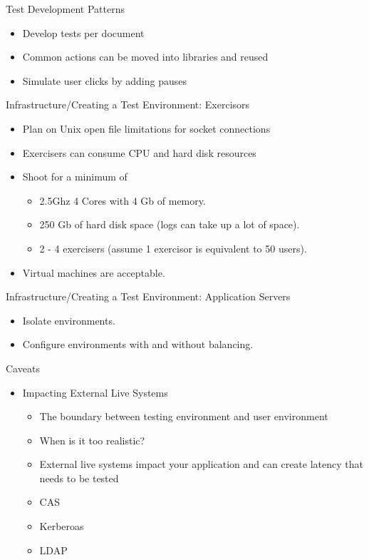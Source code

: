 \documentclass[xcolor=dvipsnames,14pt]{beamer}
\begin{document}
\begin{frame}{Test Development Patterns}
  \begin{itemize}
    \item Develop tests per document
    \item Common actions can be moved into libraries and reused
    \item Simulate user clicks by adding pauses
  \end{itemize}
\end{frame}

\begin{frame}{Infrastructure/Creating a Test Environment: Exercisors}
  \begin{itemize}
    \item Plan on Unix open file limitations for socket connections
    \item Exercisers can consume CPU and hard disk resources
    \item Shoot for a minimum of
    \begin{itemize}
      \item 2.5Ghz 4 Cores with 4 Gb of memory.
      \item 250 Gb of hard disk space (logs can take up a lot of space).
      \item 2 - 4 exercisers (assume 1 exercisor is equivalent to 50 users).
    \end{itemize}
    \item Virtual machines are acceptable.    
  \end{itemize}
\end{frame}

\begin{frame}{Infrastructure/Creating a Test Environment: Application Servers}
  \begin{itemize}
    \item Isolate environments.
    \item Configure environments with and without balancing.
  \end{itemize}
\end{frame}

\begin{frame}{Caveats}
  \begin{itemize}
    \item Impacting External Live Systems
      \begin{itemize}
        \item The boundary between testing environment and user environment
        \item When is it too realistic?
        \item External live systems impact your application and can create latency that needs to be tested
        \item CAS
        \item Kerberoas
        \item LDAP
      \end{itemize}
  \end{itemize}
\end{frame}
\end{document}
